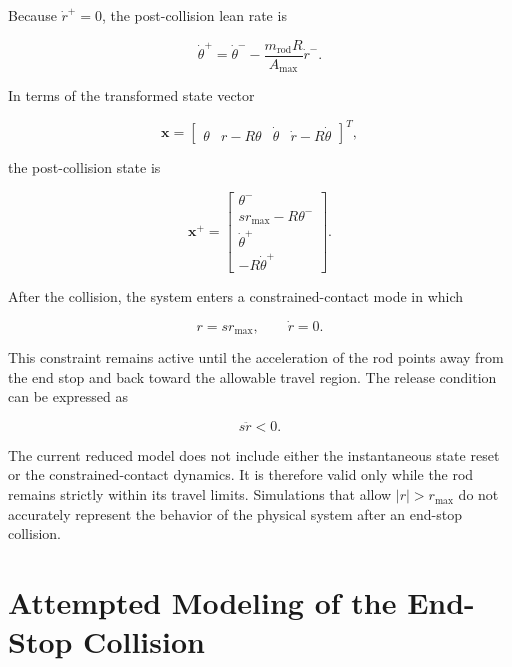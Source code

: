 Because $\dot{r}^{+}=0$, the post-collision lean rate is

\begin{equation}
\dot{\theta}^{+}
=
\dot{\theta}^{-}
-
\frac{m_{\mathrm{rod}}R}{A_{\max}}
\dot{r}^{-}.
\label{eq:collision-lean-rate-reset}
\end{equation}

In terms of the transformed state vector

\begin{equation}
\mathbf{x}
=
\begin{bmatrix}
\theta &
r-R\theta &
\dot{\theta} &
\dot{r}-R\dot{\theta}
\end{bmatrix}^{T},
\end{equation}

the post-collision state is

\begin{equation}
\mathbf{x}^{+}
=
\begin{bmatrix}
\theta^{-}
\\
s r_{\max}-R\theta^{-}
\\
\dot{\theta}^{+}
\\
-R\dot{\theta}^{+}
\end{bmatrix}.
\label{eq:collision-state-reset}
\end{equation}

After the collision, the system enters a constrained-contact mode in which

\begin{equation}
r=s r_{\max},
\qquad
\dot{r}=0.
\end{equation}

This constraint remains active until the acceleration of the rod points away from the end stop and back toward the allowable travel region. The release condition can be expressed as

\begin{equation}
s\ddot{r}<0.
\label{eq:end-stop-release-condition}
\end{equation}

The current reduced model does not include either the instantaneous state reset or the constrained-contact dynamics. It is therefore valid only while the rod remains strictly within its travel limits. Simulations that allow $|r|>r_{\max}$ do not accurately represent the behavior of the physical system after an end-stop collision.

\section{Attempted Modeling of the End-Stop Collision}
\label{sec:collision-model-attempt}

